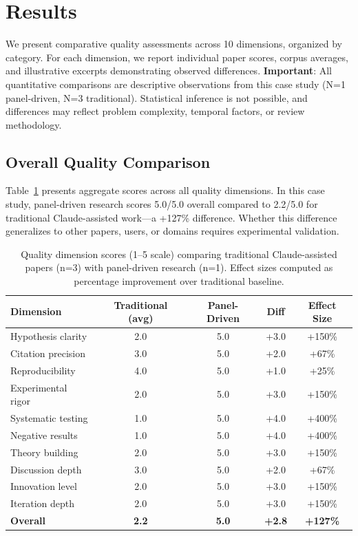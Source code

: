 \section{Results}
\label{sec:results}

We present comparative quality assessments across 10 dimensions, organized by category. For each dimension, we report individual paper scores, corpus averages, and illustrative excerpts demonstrating observed differences. \textbf{Important}: All quantitative comparisons are descriptive observations from this case study (N=1 panel-driven, N=3 traditional). Statistical inference is not possible, and differences may reflect problem complexity, temporal factors, or review methodology.

\subsection{Overall Quality Comparison}

Table~\ref{tab:overall} presents aggregate scores across all quality dimensions. In this case study, panel-driven research scores 5.0/5.0 overall compared to 2.2/5.0 for traditional Claude-assisted work---a +127\% difference. Whether this difference generalizes to other papers, users, or domains requires experimental validation.

\begin{table}[h]
\centering
\small
\begin{tabular}{lcccc}
\toprule
\textbf{Dimension} & \textbf{Traditional (avg)} & \textbf{Panel-Driven} & \textbf{Diff} & \textbf{Effect Size} \\
\midrule
Hypothesis clarity & 2.0 & 5.0 & +3.0 & +150\% \\
Citation precision & 3.0 & 5.0 & +2.0 & +67\% \\
Reproducibility & 4.0 & 5.0 & +1.0 & +25\% \\
\midrule
Experimental rigor & 2.0 & 5.0 & +3.0 & +150\% \\
Systematic testing & 1.0 & 5.0 & +4.0 & +400\% \\
\midrule
Negative results & 1.0 & 5.0 & +4.0 & +400\% \\
Theory building & 2.0 & 5.0 & +3.0 & +150\% \\
Discussion depth & 3.0 & 5.0 & +2.0 & +67\% \\
\midrule
Innovation level & 2.0 & 5.0 & +3.0 & +150\% \\
Iteration depth & 2.0 & 5.0 & +3.0 & +150\% \\
\midrule
\textbf{Overall} & \textbf{2.2} & \textbf{5.0} & \textbf{+2.8} & \textbf{+127\%} \\
\bottomrule
\end{tabular}
\caption{Quality dimension scores (1--5 scale) comparing traditional Claude-assisted papers (n=3) with panel-driven research (n=1). Effect sizes computed as percentage improvement over traditional baseline.}
\label{tab:overall}
\end{table}

